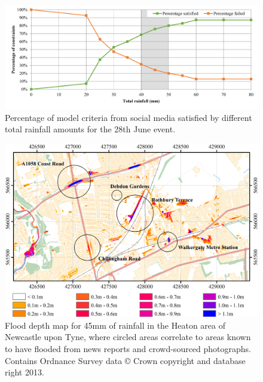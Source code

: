 \begin{figure}[tpb]
	\centering
	\includegraphics[width=1.0\textwidth]{nowcasting-figures/nclsm-percentage-satisfied-28jun.png}
	\caption{Percentage of model criteria from social media satisfied by different total rainfall amounts for the 28th June event.}
	\label{NclSM-Percentage-Satisfied-28Jun}
\end{figure}

\begin{figure}[tpb]
	\centering
	\includegraphics[width=1.0\textwidth]{nowcasting-figures/nclsm-depth-map.png}
	\caption{Flood depth map for 45mm of rainfall in the Heaton area of Newcastle upon Tyne, where circled areas correlate to areas known to have flooded from news reports and crowd-sourced photographs. Contains Ordnance Survey data \copyright{} Crown copyright and database right 2013.}
	\label{NclSM-Depth-Map}
\end{figure}

